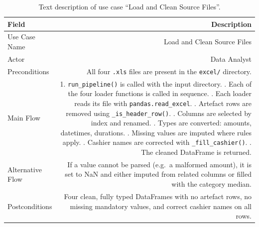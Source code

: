 \documentclass[12pt, a4paper]{report}
\begin{document}
\begin{table}[H]
\centering
\caption{Text description of use case ``Load and Clean Source Files''.\label{tab:uc_clean}}
\begin{tabular}{L R}
  \toprule
  \textbf{Field} & \textbf{Description} \\
  \midrule
  Use Case Name  & Load and Clean Source Files \\
  Actor          & Data Analyst \\
  Preconditions  & All four \texttt{.xls} files are present in the \texttt{excel/}
                   directory. \\
  Main Flow      & 1. \texttt{run\_pipeline()} is called with the input directory. . Each of the four loader functions is called in sequence. . Each loader reads its file with \texttt{pandas.read\_excel}. . Artefact rows are removed using \texttt{\_is\_header\_row()}. . Columns are selected by index and renamed. . Types are converted: amounts, datetimes, durations. . Missing values are imputed where rules apply. . Cashier names are corrected with \texttt{\_fill\_cashier()}. . The cleaned DataFrame is returned. \\
  Alternative Flow & If a value cannot be parsed (e.g.\ a malformed amount), it is
                   set to NaN and either imputed from related columns or filled
                   with the category median. \\
  Postconditions & Four clean, fully typed DataFrames with no artefact rows,
                   no missing mandatory values, and correct cashier names on all
                   rows. \\
  \bottomrule
\end{tabular}
\end{table}

\end{document}
